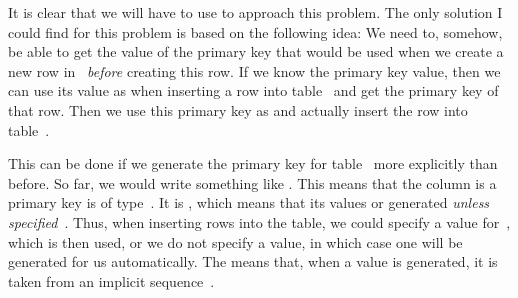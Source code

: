 It is clear that we will have to use  to approach this problem.
The only solution I could find for this problem is based on the following idea:
We need to, somehow, be able to get the value of the primary key that would be used when we create a new row in~ \emph{before} creating this row.
If we know the primary key value, then we can use its value as  when inserting a row into table~ and get the primary key of that row.
Then we use this primary key as  and actually insert the row into table~.

This can be done if we generate the primary key for table~ more explicitly than before.
So far, we would write something like .
This means that the column is a primary key is of type~.
It is , which means that its values or generated \emph{unless specified}~\cite{PGDG:PD:GC}.
Thus, when inserting rows into the table, we could specify a value for~, which is then used, or we do not specify a value, in which case one will be generated for us automatically.
The  means that, when a value is generated, it is taken from an implicit sequence~\cite{PGDG:PD:IC}.

